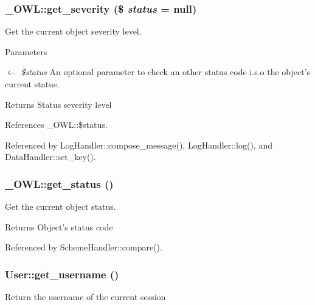 \subsubsection[{get\_\-severity}]{\setlength{\rightskip}{0pt plus 5cm}\_\-OWL::get\_\-severity (\$ {\em status} = {\ttfamily null})}\label{class__OWL_adf9509ef96858be7bdd9414c5ef129aa}
Get the current object severity level.


\begin{DoxyParams}{Parameters}
\item[\mbox{$\leftarrow$} {\em \$status}]An optional parameter to check an other status code i.s.o the object's current status. \end{DoxyParams}
\begin{DoxyReturn}{Returns}
Status severity level 
\end{DoxyReturn}


References \_\-OWL::\$status.



Referenced by LogHandler::compose\_\-message(), LogHandler::log(), and DataHandler::set\_\-key().

\subsubsection[{get\_\-status}]{\setlength{\rightskip}{0pt plus 5cm}\_\-OWL::get\_\-status ()}\label{class__OWL_a99ec771fa2c5c279f80152cc09e489a8}
Get the current object status.

\begin{DoxyReturn}{Returns}
Object's status code 
\end{DoxyReturn}


Referenced by SchemeHandler::compare().

\subsubsection[{get\_\-username}]{\setlength{\rightskip}{0pt plus 5cm}User::get\_\-username ()}\label{classUser_a1348ddf190d4df2518665fb51305a902}
Return the username of the current session 

